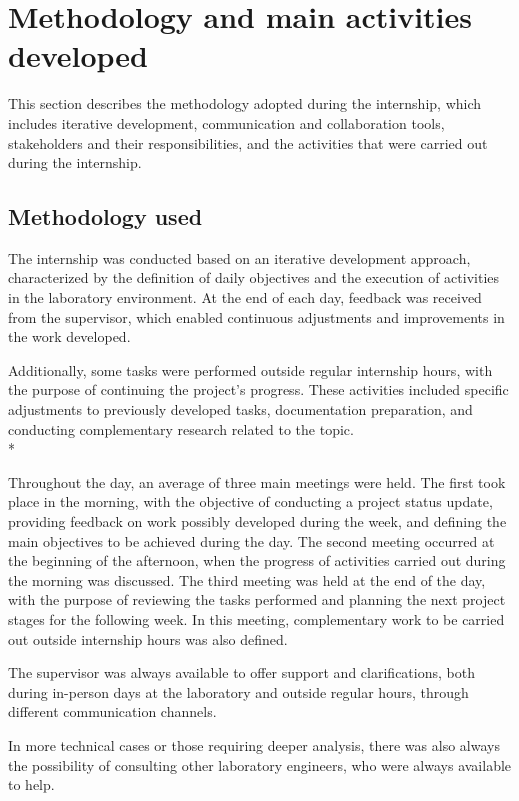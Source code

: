 \section{Methodology and main activities developed}

This section describes the methodology adopted during the internship, which includes iterative development, communication and collaboration tools, stakeholders and their responsibilities, and the activities that were carried out during the internship.

\subsection{Methodology used}
The internship was conducted based on an iterative development approach, characterized by the definition of daily objectives and the execution of activities in the laboratory environment. At the end of each day, feedback was received from the supervisor, which enabled continuous adjustments and improvements in the work developed.

Additionally, some tasks were performed outside regular internship hours, with the purpose of continuing the project's progress. These activities included specific adjustments to previously developed tasks, documentation preparation, and conducting complementary research related to the topic. \\*

Throughout the day, an average of three main meetings were held. The first took place in the morning, with the objective of conducting a project status update, providing feedback on work possibly developed during the week, and defining the main objectives to be achieved during the day. The second meeting occurred at the beginning of the afternoon, when the progress of activities carried out during the morning was discussed. The third meeting was held at the end of the day, with the purpose of reviewing the tasks performed and planning the next project stages for the following week. In this meeting, complementary work to be carried out outside internship hours was also defined.

The supervisor was always available to offer support and clarifications, both during in-person days at the laboratory and outside regular hours, through different communication channels.

In more technical cases or those requiring deeper analysis, there was also always the possibility of consulting other laboratory engineers, who were always available to help.

